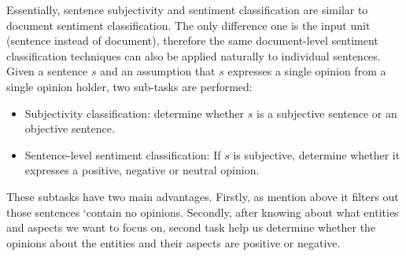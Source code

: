 \documentclass{article}
\begin{document}
Essentially, sentence subjectivity and sentiment classification are similar to document sentiment classification.
The only difference one is the input unit (sentence instead of document), therefore the same document-level sentiment classification techniques can also be applied naturally to individual sentences.
Given a sentence $s$ and an assumption that $s$ expresses a single opinion from a single opinion holder, two sub-tasks are performed:
\begin{itemize}
    \item Subjectivity classification: determine whether $s$ is a subjective sentence or an objective sentence.
    \item Sentence-level sentiment classification: If $s$ is subjective, determine whether it expresses a positive, negative or neutral opinion.
\end{itemize}
These subtasks have two main advantages. 
Firstly, as mention above it filters out those sentences `contain no opinions. 
Secondly, after knowing about what entities and aspects we want to focus on, second task help us determine whether the opinions about the entities and their aspects are positive or negative. 
\end{document}
